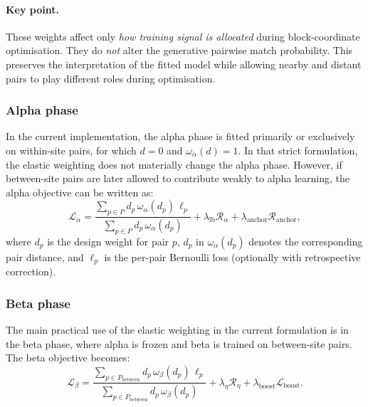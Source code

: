 \documentclass{article}
\begin{document}
\paragraph{Key point.}
These weights affect only \emph{how training signal is allocated} during block-coordinate optimisation. They do \emph{not} alter the generative pairwise match probability. This preserves the interpretation of the fitted model while allowing nearby and distant pairs to play different roles during optimisation.

\subsubsection{Alpha phase}

In the current implementation, the alpha phase is fitted primarily or exclusively on within-site pairs, for which \(d=0\) and \(\omega_\alpha(d)=1\). In that strict formulation, the elastic weighting does not materially change the alpha phase. However, if between-site pairs are later allowed to contribute weakly to alpha learning, the alpha objective can be written as:
\begin{equation}
    \mathcal{L}_\alpha
    =
    \frac{
    \sum_{p \in P}
    d_p \, \omega_\alpha(d_p)\, \ell_p
    }{
    \sum_{p \in P}
    d_p \, \omega_\alpha(d_p)
    }
    +
    \lambda_{\mathrm{lb}} \mathcal{R}_\alpha
    +
    \lambda_{\mathrm{anchor}} \mathcal{R}_{\mathrm{anchor}},
\end{equation}
where \(d_p\) is the design weight for pair \(p\), \(d_p\) in \(\omega_\alpha(d_p)\) denotes the corresponding pair distance, and \(\ell_p\) is the per-pair Bernoulli loss (optionally with retrospective correction).

\subsubsection{Beta phase}

The main practical use of the elastic weighting in the current formulation is in the beta phase, where alpha is frozen and beta is trained on between-site pairs. The beta objective becomes:
\begin{equation}
    \mathcal{L}_\beta
    =
    \frac{
    \sum_{p \in P_{\mathrm{between}}}
    d_p \, \omega_\beta(d_p)\, \ell_p
    }{
    \sum_{p \in P_{\mathrm{between}}}
    d_p \, \omega_\beta(d_p)
    }
    +
    \lambda_{\eta}\mathcal{R}_{\eta}
    +
    \lambda_{\mathrm{boost}}\mathcal{L}_{\mathrm{boost}}.
\end{equation}
\end{document}
